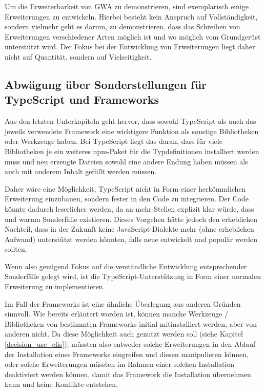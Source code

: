 Um die Erweiterbarkeit von \gls{GWA} zu demonstrieren, sind exemplarisch einige Erweiterungen zu entwickeln. Hierbei besteht kein Anspruch auf Vollständigkeit, sondern vielmehr geht es darum, zu demonstrieren, dass das Schreiben von Erweiterungen verschiedener Arten möglich ist und wo möglich vom Grundgerüst unterstützt wird. Der Fokus bei der Entwicklung von Erweiterungen liegt daher nicht auf Quantität, sondern auf Vielseitigkeit.

\subsection{Abwägung über Sonderstellungen für TypeScript und Frameworks}
Aus den letzten Unterkapiteln geht hervor, dass sowohl TypeScript als auch das jeweils verwendete Framework eine wichtigere Funktion als sonstige Bibliotheken oder Werkzeuge haben. Bei TypeScript liegt das daran, dass für viele Bibliotheken je ein weiteres \gls{npm}-Paket für die Typdefinitionen installiert werden muss und neu erzeugte Dateien sowohl eine andere Endung haben müssen als auch mit anderem Inhalt gefüllt werden müssen.

Daher wäre eine Möglichkeit, TypeScript nicht in Form einer herkömmlichen Erweiterung einzubauen, sondern fester in den Code zu integrieren. Der Code könnte dadurch leserlicher werden, da an mehr Stellen explizit klar würde, dass und warum Sonderfälle existieren. Dieses Vorgehen hätte jedoch den erheblichen Nachteil, dass in der Zukunft keine JavaScript-Dialekte mehr (ohne erheblichen Aufwand) unterstützt werden könnten, falls neue entwickelt und populär werden sollten.

Wenn also genügend Fokus auf die verständliche Entwicklung entsprechender Sonderfälle gelegt wird, ist die TypeScript-Unterstützung in Form einer normalen Erweiterung zu implementieren.

Im Fall der Frameworks ist eine ähnliche Überlegung aus anderen Gründen sinnvoll. Wie bereits erläutert worden ist, können manche Werkzeuge / Bibliotheken von bestimmten Frameworks initial mitinstalliert werden, aber von anderen nicht. Da diese Möglichkeit auch genutzt werden soll (siehe Kapitel \ref{decision_use_clis}), müssten also entweder solche Erweiterungen in den Ablauf der Installation eines Frameworks eingreifen und diesen manipulieren können, oder solche Erweiterungen müssten im Rahmen einer solchen Installation deaktiviert werden können, damit das Framework die Installation übernehmen kann und keine Konflikte entstehen.

